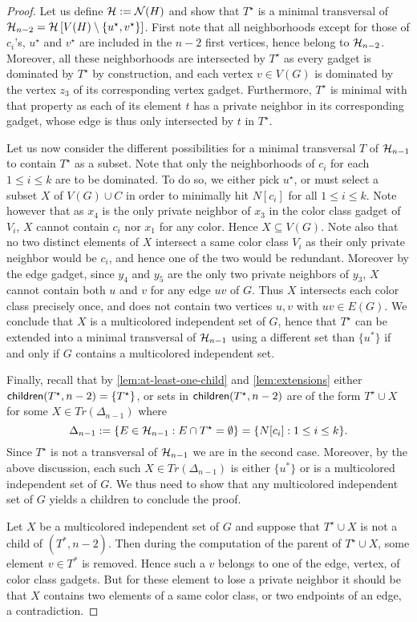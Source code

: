 {\begin{proof}
    Let us define $\mathcal{H}:=\mathcal{N}(H)$ and show that $T^\star$ is a minimal transversal of $\mathcal{H}_{n-2} = \mathcal{H}\left[V(H) \setminus \{u^\star, v^\star\}\right]$.
    First note that all neighborhoods except for those of $c_i$'s, $u^\star$ and $v^\star$ are included in the $n-2$ first vertices, hence belong to $\mathcal{H}_{n-2}$.
    Moreover, all these neighborhoods are intersected by $T^\star$ as every gadget is dominated by $T^\star$ by construction, and each vertex $v\in V(G)$ is dominated by the vertex $z_3$ of its corresponding vertex gadget.
    Furthermore, $T^\star$ is minimal with that property as each of its element $t$ has a private neighbor in its corresponding gadget, whose edge is thus only intersected by $t$ in $T^\star$.

    Let us now consider the different possibilities for a minimal transversal $T$ of $\mathcal{H}_{n-1}$ to contain $T^\star$ as a subset.
    Note that only the neighborhoods of $c_i$ for each $1\leq i\leq k$ are to be dominated. 
    To do so, we either pick $u^\star$, or must select a subset $X$ of $V(G)\cup C$ in order to minimally hit $N[c_i]$ for all $1\leq i\leq k$.
    Note however that as $x_4$ is the only private neighbor of $x_3$ in the color class gadget of $V_i$, $X$ cannot contain $c_i$ nor $x_1$ for any color.
    Hence $X\subseteq V(G)$.
    Note also that no two distinct elements of $X$ intersect a same color class $V_i$ as their only private neighbor would be $c_i$, and hence one of the two would be redundant.
    Moreover by the edge gadget, since $y_4$ and $y_5$ are the only two private neighbors of $y_3$, $X$ cannot contain both $u$ and $v$ for any edge $uv$ of $G$.
    Thus $X$ intersects each color class precisely once, and does not contain two vertices $u,v$ with $uv\in E(G)$.
    We conclude that $X$ is a multicolored independent set of $G$, hence that $T^\star$ can be extended into a minimal transversal of $\mathcal{H}_{n-1}$ using a different set than $\{u^*\}$ if and only if $G$ contains a multicolored independent set. 
    
    Finally, recall that by 
    \autoref{lem:at-least-one-child} and
    \autoref{lem:extensions} either $\operatorname{{\sf children}}(T^\star,n-2)=\{T^\star\}$, or sets in $\operatorname{{\sf children}}(T^\star,n-2)$ are of the form $T^\star\cup X$ for some $X\in Tr(\Delta_{n-1})$ where 
    \[
        \Delta_{n-1}:=\{E\in \mathcal{H}_{n-1} : E\cap T^{\star}=\emptyset\}=\{N[c_i] : 1\leq i\leq k\}.
    \]
    Since $T^\star$ is not a transversal of $\mathcal{H}_{n-1}$ we are in the second case.
    Moreover, by the above discussion, each such $X\in Tr(\Delta_{n-1})$ is either $\{u^*\}$ or is a multicolored independent set of $G$.
    We thus need to show that any multicolored independent set of $G$ yields a children to conclude the proof.

    Let $X$ be a multicolored independent set of $G$ and suppose that $T^\star\cup X$ is not a child of $(T^*,n-2)$.
    Then during the computation of the parent of $T^\star\cup X$, some element $v\in T^*$ is removed.
    Hence such a $v$ belongs to one of the edge, vertex, of color class gadgets.
    But for these element to lose a private neighbor it should be that $X$ contains two elements of a same color class, or two endpoints of an edge, a contradiction.
\end{proof}}{}


